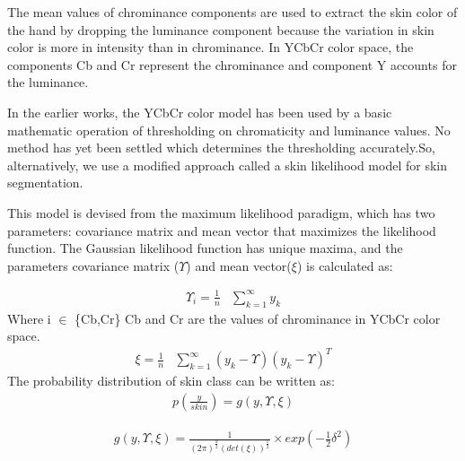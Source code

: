 \documentclass[conference]{IEEEtran}
\begin{document}
The mean values of chrominance components are used to extract the skin color of the hand by dropping the luminance component because the variation in skin color is more in intensity than in chrominance. In YCbCr color space, the components Cb and Cr represent the chrominance and component Y accounts for the luminance.

In the earlier works, the YCbCr color model has been used by a basic mathematic operation of thresholding on chromaticity and luminance values. No method has yet been settled which determines the thresholding accurately.So, alternatively, we use a modified approach called a skin likelihood model for skin segmentation.

This model is devised from the maximum likelihood paradigm, which has two parameters: covariance matrix and mean vector that maximizes the likelihood function. The Gaussian likelihood function \cite{vishwakarma2015efficient} has unique maxima, and the parameters  covariance matrix ($\Upsilon$) and mean vector($\xi$) is calculated as:

\begin{equation}
\begin{aligned}
\Upsilon_i = \frac{1}{n} & \sum_{k=1}^\infty y_k
\end{aligned}
\end{equation}
Where i $\in$ \{Cb,Cr\}  Cb and Cr are the values of chrominance in YCbCr color space.
\begin{equation}
\begin{aligned}
\xi = \frac{1}{n} & \sum_{k=1}^\infty \left(y_k - \Upsilon \right)\left(y_k - \Upsilon \right)^T
\end{aligned}
\end{equation}
The probability distribution of skin class can be written as:
\begin{equation}
\begin{aligned}
p(\frac{y}{skin}) =  g(y,\Upsilon,\xi)
\end{aligned}
\end{equation}

\begin{equation}
\begin{aligned}
g(y,\Upsilon,\xi) =  \frac{1}{(2\pi)^{\frac{d}{2}}\left(det\left(\xi \right)\right)^\frac{1}{2}} \times exp(-\frac{1}{2}\delta^2)
\end{aligned}
\end{equation}
\end{document}

